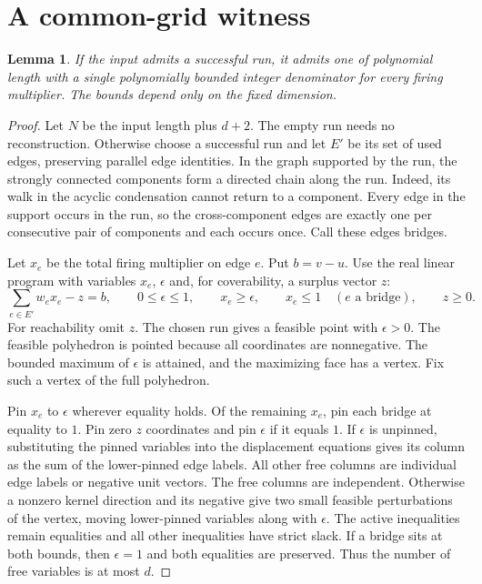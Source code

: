 \documentclass[a4paper,11pt]{amsart}
\newtheorem{lem}[thm]{Lemma}
\begin{document}
\section{A common-grid witness}
\begin{lem}
If the input admits a successful run, it admits one of polynomial length with a single polynomially bounded integer denominator for every firing multiplier. The bounds depend only on the fixed dimension.
\end{lem}
\begin{proof}
Let $N$ be the input length plus $d+2$. The empty run needs no reconstruction. Otherwise choose a successful run and let $E'$ be its set of used edges, preserving parallel edge identities. In the graph supported by the run, the strongly connected components form a directed chain along the run. Indeed, its walk in the acyclic condensation cannot return to a component. Every edge in the support occurs in the run, so the cross-component edges are exactly one per consecutive pair of components and each occurs once. Call these edges bridges.

Let $x_e$ be the total firing multiplier on edge $e$. Put $b=v-u$. Use the real linear program with variables $x_e$, $\epsilon$ and, for coverability, a surplus vector $z$:
\[
 \sum_{e\in E'} w_e x_e-z=b,\qquad
 0\le\epsilon\le1,\qquad x_e\ge\epsilon,\qquad
 x_e\le1\quad(e\text{ a bridge}),\qquad z\ge0.
\]
For reachability omit $z$. The chosen run gives a feasible point with $\epsilon>0$. The feasible polyhedron is pointed because all coordinates are nonnegative. The bounded maximum of $\epsilon$ is attained, and the maximizing face has a vertex. Fix such a vertex of the full polyhedron.

Pin $x_e$ to $\epsilon$ wherever equality holds. Of the remaining $x_e$, pin each bridge at equality to $1$. Pin zero $z$ coordinates and pin $\epsilon$ if it equals $1$. If $\epsilon$ is unpinned, substituting the pinned variables into the displacement equations gives its column as the sum of the lower-pinned edge labels. All other free columns are individual edge labels or negative unit vectors. The free columns are independent. Otherwise a nonzero kernel direction and its negative give two small feasible perturbations of the vertex, moving lower-pinned variables along with $\epsilon$. The active inequalities remain equalities and all other inequalities have strict slack. If a bridge sits at both bounds, then $\epsilon=1$ and both equalities are preserved. Thus the number of free variables is at most $d$.


\end{proof}
\end{document}
